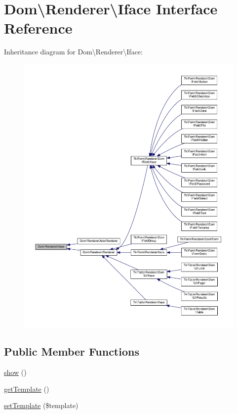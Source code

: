 \hypertarget{interfaceDom_1_1Renderer_1_1Iface}{\section{Dom\textbackslash{}Renderer\textbackslash{}Iface Interface Reference}
\label{interfaceDom_1_1Renderer_1_1Iface}
}


Inheritance diagram for Dom\textbackslash{}Renderer\textbackslash{}Iface\+:\nopagebreak
\begin{figure}[H]
\begin{center}
\leavevmode
\includegraphics[width=350pt]{interfaceDom_1_1Renderer_1_1Iface__inherit__graph}
\end{center}
\end{figure}
\subsection*{Public Member Functions}
\begin{DoxyCompactItemize}
\item 
\hyperlink{interfaceDom_1_1Renderer_1_1Iface_a79a0ba41fb6714d69156891d6326bd33}{show} ()
\item 
\hyperlink{interfaceDom_1_1Renderer_1_1Iface_ad24995320dbbbd8a1796c1d13518012c}{get\+Template} ()
\item 
\hyperlink{interfaceDom_1_1Renderer_1_1Iface_a6e4c7ff3f90a9b1a26bc08bf6e1408d6}{set\+Template} (\$template)
\end{DoxyCompactItemize}


